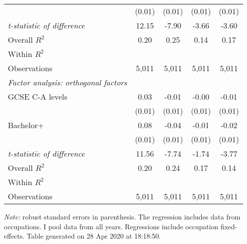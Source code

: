 \begin{center}
\begin{threeparttable}[!h]
\begin{tabular}{lcccc}
                    &      (0.01)         &      (0.01)         &      (0.01)         &      (0.01)         \\
\textit{t-statistic of difference}&       12.15         &       -7.90         &       -3.66         &       -3.60         \\
\midrule Overall $ R^2$&        0.20         &        0.25         &        0.14         &        0.17         \\
Within $ R^2$       &                     &                     &                     &                     \\
Observations        &       5,011         &       5,011         &       5,011         &       5,011         \\
\midrule \vspace{1mm}\textit{Factor analysis: orthogonal factors} \\ 
\hspace{3mm}GCSE C-A levels&        0.03\sym{*}  &       -0.01         &       -0.00         &       -0.01         \\
                    &      (0.01)         &      (0.01)         &      (0.01)         &      (0.01)         \\
\hspace{3mm}Bachelor+&        0.08\sym{***}&       -0.04\sym{***}&       -0.01         &       -0.02\sym{*}  \\
                    &      (0.01)         &      (0.01)         &      (0.01)         &      (0.01)         \\
\textit{t-statistic of difference}&       11.56         &       -7.74         &       -1.74         &       -3.77         \\
\midrule Overall $ R^2$&        0.20         &        0.24         &        0.17         &        0.14         \\
Within $ R^2$       &                     &                     &                     &                     \\
Observations        &       5,011         &       5,011         &       5,011         &       5,011         \\
\bottomrule
\bottomrule
\end{tabular}
\begin{tablenotes}
\item \footnotesize \textit{Note:} robust standard errors in parenthesis. The regression includes data from occupations. I pool data from all years. Regressions include occupation fixed-effects. Table generated on 28 Apr 2020 at 18:18:50.
\end{tablenotes}
\end{threeparttable}
\end{center}
